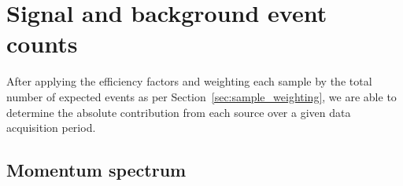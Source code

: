 \section{Signal and background event counts}

After applying the efficiency factors and weighting each sample by the total
number of expected events as per Section~\ref{sec:sample_weighting}, we are able
to determine the absolute contribution from each source over a given data
acquisition period.

\subsection{Momentum spectrum}

\begin{figure}
    \centering
        

\end{figure}
